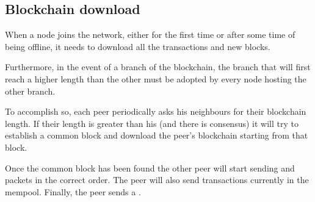 \documentclass[../documentation.tex]{subfiles}
\begin{document}
\subsection{Blockchain download}

When a node joins the network, either for the first time
or after some time of being offline, it needs to download
all the transactions and new blocks.

Furthermore, in the event of a branch of the blockchain, the branch
that will first reach a higher length than the other must be adopted
by every node hosting the other branch.

To accomplish so, each peer periodically asks his neighbours for their blockchain length.
If their length is greater than his (and there is consensus) it will try to establish a common block
and download the peer's blockchain starting from that block.

\begin{center}
\end{center}

Once the common block has been found the other peer will start sending
 and  packets in the correct order.
The peer will also send transactions currently in the mempool. Finally, the peer sends a
.
\end{document}
